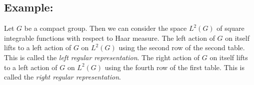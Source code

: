 \documentclass[a4paper,11pt,twoside]{amsart}
\newcommand{\C}{\mathbb{C}}
\theoremstyle{definition}
\begin{document}
\subsection*{Example:} Let $G$ be a compact group. Then we can consider the space $L^2(G)$ of  square integrable functions with respect to Haar measure. The left action of $G$ on itself lifts to a left action of $G$ on $L^2(G)$ using the second row of the second table. This is called the \emph{left regular representation}. The right action of $G$ on itself lifts to a left action of $G$ on $L^2(G)$ using the fourth row of the first table. This is called the \emph{right regular representation}.

\end{document}
